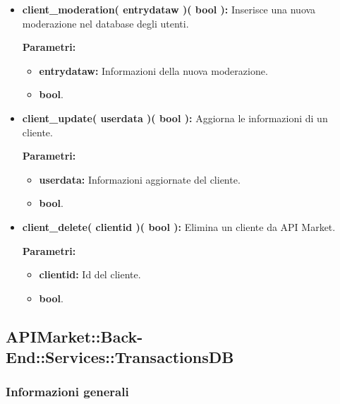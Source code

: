 \begin{itemize}
\begin{itemize}
			\item \textbf{client\_moderation( entrydataw )( bool ):} Inserisce una nuova moderazione nel database degli utenti.
				\begin{description}
    				\item[\textbf{Parametri:}]
				\end{description}
				\begin{itemize}
					\item \textbf{entrydataw:} Informazioni della nuova moderazione.
					\item \textbf{bool}.
				\end{itemize}
				
			\item \textbf{client\_update( userdata )( bool ):} Aggiorna le informazioni di un cliente.
				\begin{description}
    				\item[\textbf{Parametri:}]
				\end{description}
				\begin{itemize}
					\item \textbf{userdata:} Informazioni aggiornate del cliente.
					\item \textbf{bool}.
				\end{itemize}
				
			\item \textbf{client\_delete( clientid )( bool ):} Elimina un cliente da API Market.
				\begin{description}
    				\item[\textbf{Parametri:}]
				\end{description}
				\begin{itemize}
					\item \textbf{clientid:} Id del cliente.
					\item \textbf{bool}.
				\end{itemize}
					
		\end{itemize}
\end{itemize}

\subsection{APIMarket::Back-End::Services::TransactionsDB}

\subsubsection{Informazioni generali}

